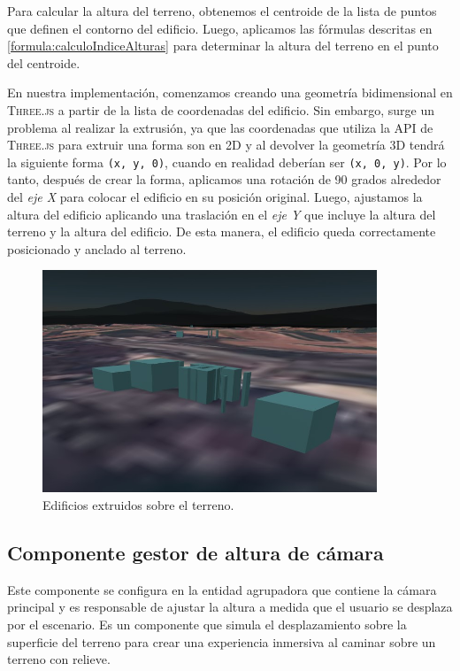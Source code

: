 \documentclass[a4paper, 11pt]{book}
\begin{document}
Para calcular la altura del terreno, obtenemos el \gls{centroide} de la lista de puntos que definen el contorno del edificio. Luego, aplicamos las fórmulas descritas en \ref{formula:calculoIndiceAlturas} para determinar la altura del terreno en el punto del centroide.

En nuestra implementación, comenzamos creando una geometría bidimensional en \textsc{Three.js} a partir de la lista de coordenadas del edificio. Sin embargo, surge un problema al realizar la extrusión, ya que las coordenadas que utiliza la API de \textsc{Three.js} para extruir una forma son en 2D y al devolver la geometría 3D tendrá la siguiente forma \texttt{(x, y, 0)}, cuando en realidad deberían ser \texttt{(x, 0, y)}. 
Por lo tanto, después de crear la forma, aplicamos una rotación de 90 grados alrededor del \emph{eje X} para colocar el edificio en su posición original. Luego, ajustamos la altura del edificio aplicando una traslación en el \emph{eje Y} que incluye la altura del terreno y la altura del edificio. De esta manera, el edificio queda correctamente posicionado y anclado al terreno.

\begin{figure}[h]
  \centering
  \includegraphics[width=10cm, keepaspectratio]{img/buildings.jpg}
  \caption{Edificios extruidos sobre el terreno.}
  \label{fig:buildings}
\end{figure}
\subsection{Componente gestor de altura de cámara}
\label{subsec:cameraHeight}
Este componente se configura en la entidad agrupadora que contiene la cámara principal y es responsable de ajustar la altura a medida que el usuario se desplaza por el escenario. Es un componente que simula el desplazamiento sobre la superficie del terreno para crear una experiencia inmersiva al caminar sobre un terreno con relieve.
\end{document}
